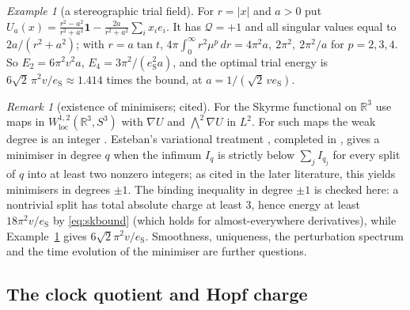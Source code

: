 \documentclass[aps,pra,onecolumn,superscriptaddress,nofootinbib,10pt]{revtex4-2}
\theoremstyle{definition}
\theoremstyle{remark}
\newtheorem{remark}[theorem]{Remark}
\newtheorem{example}[theorem]{Example}
\newcommand{\R}{\mathbb{R}}
\begin{document}
\begin{example}[a stereographic trial field]\label{ex:sktrial}
For $r=\lvert x\rvert$ and $a>0$ put $U_a(x)=\frac{r^2-a^2}{r^2+a^2}\mathbf1-\frac{2a}{r^2+a^2}\sum_ix_ie_i$.  It has $\mathcal Q=+1$ and all singular values equal to
$2a/(r^2+a^2)$; with $r=a\tan t$, $4\pi\int_0^\infty r^2\mu^p\,dr=4\pi^2a,\ 2\pi^2,\ 2\pi^2/a$ for $p=2,3,4$.  So $E_2=6\pi^2v^2a$,
$E_4=3\pi^2/(e_{\mathrm S}^2a)$, and the optimal trial energy is $6\sqrt2\,\pi^2v/e_{\mathrm S}\approx1.414$ times the bound, at $a=1/(\sqrt2\,ve_{\mathrm S})$.
\end{example}

\begin{remark}[existence of minimisers; cited]\label{rem:esteban}
For the Skyrme functional on $\R^3$ use maps in $W^{1,2}_{\mathrm{loc}}(\R^3,S^3)$ with $\nabla U$ and $\bigwedge^2\nabla U$ in $L^2$.  For such maps the
weak degree is an integer \cite{n6:esteban-muller}.  Esteban's variational treatment
\cite{n6:esteban1986}, completed in \cite{n6:esteban2004}, gives a minimiser in degree $q$ when the infimum $I_q$ is
strictly below $\sum_jI_{q_j}$ for every split of $q$ into at least two nonzero integers; as cited in the later
literature, this yields minimisers in degrees $\pm1$.  The binding inequality in degree $\pm1$ is checked here:
a nontrivial split has total absolute charge at least $3$, hence energy at least $18\pi^2v/e_{\mathrm S}$ by \eqref{eq:skbound}
(which holds for almost-everywhere derivatives), while Example~\ref{ex:sktrial} gives $6\sqrt2\pi^2v/e_{\mathrm S}$.  Smoothness,
uniqueness, the perturbation spectrum and the time evolution of the minimiser are further questions.
\end{remark}

\subsection{The clock quotient and Hopf charge}
\end{document}
